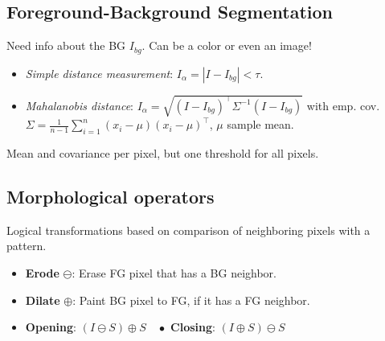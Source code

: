 \subsection{Foreground-Background Segmentation}
Need info about the BG \(I_{bg}\). Can be a color or even an image!
\begin{itemize}
  \item \textit{Simple distance measurement}: \(I_\alpha = |I - I_{bg}| < \tau\).
  \item \textit{Mahalanobis distance}: \(I_\alpha = \sqrt{(I - I_{bg})^\top \Sigma^{-1}(I - I_{bg})}\) with emp. cov. \(\Sigma = \frac{1}{n - 1} \sum_{i=1}^n (x_i - \mu) (x_i - \mu)^\top\), \(\mu\) sample mean.
\end{itemize}
Mean and covariance per pixel, but one threshold for all pixels.

\subsection{Morphological operators}
Logical transformations based on comparison of neighboring pixels with a pattern.
\begin{itemize}
  \item \textbf{Erode} \(\ominus\): Erase FG pixel that has a BG neighbor.
  \item \textbf{Dilate} \(\oplus\): Paint BG pixel to FG, if it has a FG neighbor.
  \item \textbf{Opening}: \((I \ominus S) \oplus S \quad \bullet\) \textbf{Closing}: \((I \oplus S) \ominus S\)
\end{itemize}
